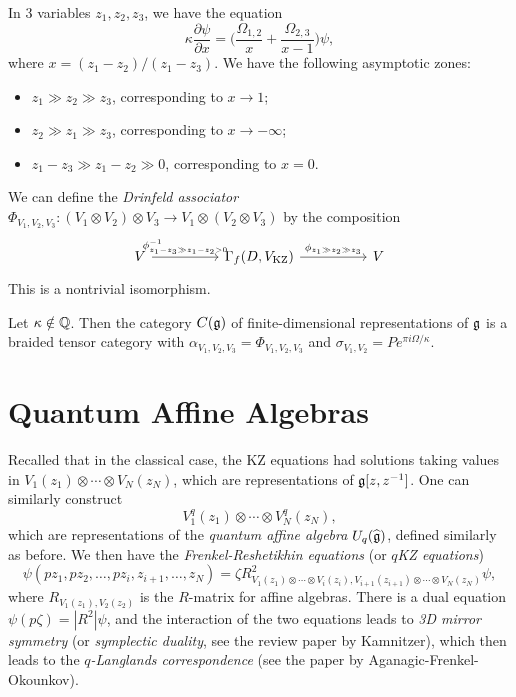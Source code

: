 \begin{remark}
  In 3 variables $z_1, z_2, z_3$, we have
  the equation
  \[
    \kappa \frac{\partial \psi}{\partial x}
    = \bigg(\frac{\Omega_{1, 2}}{x} + \frac{\Omega_{2, 3}}{x - 1}\bigg) \psi,
  \]
  where $x = (z_1 - z_2) / (z_1 - z_3)$.
  We have the following asymptotic zones:
  \begin{itemize}
    \item $z_1 \gg z_2 \gg z_3$, corresponding
      to $x \to 1$;
    \item $z_2 \gg z_1 \gg z_3$, corresponding
      to $x \to -\infty$;
    \item $z_1 - z_3 \gg z_1 - z_2 \gg 0$,
      corresponding to $x = 0$.
  \end{itemize}
  We can define the
  \emph{Drinfeld associator}
  $\Phi_{V_1, V_2, V_3} : (V_1 \otimes V_2) \otimes V_3 \to V_1 \otimes (V_2 \otimes V_3)$
  by the composition
  \[
    \begin{tikzcd}
      V \ar[rr, "\phi^{-1}_{z_1 - z_3 \gg z_1 - z_2 > 0}"] & & \Gamma_f(D, V_{\mathrm{KZ}})
      \ar[rr, "\phi_{z_1 \gg z_2 \gg z_3}"] & & V
    \end{tikzcd}
  \]
  This is a nontrivial isomorphism.
\end{remark}

\begin{theorem}
  Let $\kappa \notin \mathbb{Q}$. Then the category
  $C(\mathfrak{g})$ of finite-dimensional representations
  of $\mathfrak{g}$ is a braided tensor category with
  $\alpha_{V_1, V_2, V_3} = \Phi_{V_1, V_2, V_3}$ and
  $\sigma_{V_1, V_2}
    = P e^{\pi i \Omega / \kappa}$.
\end{theorem}

\section{Quantum Affine Algebras}

\begin{remark}
  Recalled that in the classical
  case, the KZ equations had solutions
  taking values in
  $V_1(z_1) \otimes \cdots \otimes V_N(z_N)$,
  which are representations of
  $\mathfrak{g}[z, z^{-1}]$. One can similarly
  construct
  \[
    V_1^q(z_1) \otimes \cdots \otimes V_N^q(z_N),
  \]
  which are representations of the
  \emph{quantum affine algebra}
  $U_q(\widehat{\mathfrak{g}})$, defined similarly
  as before. We then have the
  \emph{Frenkel-Reshetikhin equations}
  (or \emph{$q$KZ equations})
  \[
    \psi(pz_1, pz_2, \dots, pz_i, z_{i + 1}, \dots, z_N)
    = \zeta R_{V_1(z_1) \otimes \cdots \otimes V_i(z_i), V_{i + 1}(z_{i + 1}) \otimes \cdots \otimes V_N(z_N)}^2 \psi,
  \]
  where $R_{V_1(z_1), V_2(z_2)}$ is the
  $R$-matrix for affine algebras. There is a
  dual equation
  $\psi(p\zeta) = |R^2| \psi$, and the
  interaction of the two equations leads
  to
  \emph{3D mirror symmetry} (or \emph{symplectic duality}, see the review paper by Kamnitzer), which
  then leads to the \emph{$q$-Langlands correspondence}
  (see the paper by Aganagic-Frenkel-Okounkov).
\end{remark}

